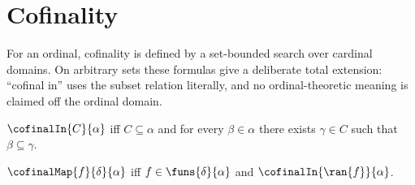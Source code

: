 \section{Cofinality}




For an ordinal, cofinality is defined by a set-bounded search over cardinal
domains.  On arbitrary sets these formulas give a deliberate total extension:
``cofinal in'' uses the subset relation literally, and no ordinal-theoretic
meaning is claimed off the ordinal domain.

\begin{definition}\label{cofinal_in}
    $\cofinalIn{C}{\alpha}$ iff $C\subseteq\alpha$ and
        for every $\beta\in\alpha$ there exists $\gamma\in C$ such that
        $\beta\subseteq\gamma$.
\end{definition}

\begin{definition}\label{cofinal_map}
    $\cofinalMap{f}{\delta}{\alpha}$ iff
        $f\in\funs{\delta}{\alpha}$ and
        $\cofinalIn{\ran{f}}{\alpha}$.
\end{definition}

